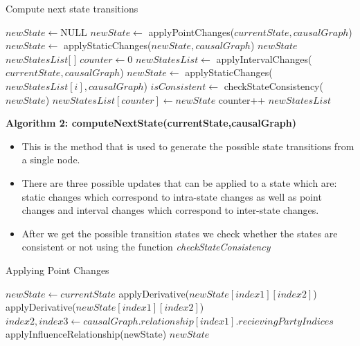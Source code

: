 \documentclass{article}
\begin{document}
\begin{algorithm}[!h]
	\caption{Compute next state transitions}\label{nextstate}
	\begin{algorithmic}[1]
		\State $newState \gets \text{NULL}$ 
		\State $newState \gets$ applyPointChanges($currentState,causalGraph$)
		\State $newState \gets$ applyStaticChanges($newState,causalGraph$)
		\State \Return $newState$
		\EndIf
		\State $newStatesList$[ ]
		\State $counter \gets 0$
		\State $newStatesList \gets$ applyIntervalChanges($currentState,causalGraph$)
		\State $newState \gets$ applyStaticChanges($newStatesList[i],causalGraph$)
		\State $isConsistent \gets$ checkStateConsistency($newState$)
		\State $newStatesList[counter] \gets newState$
		\State counter++
		\EndIf
		\EndFor
		\State \Return $newStatesList$
		\EndProcedure
	\end{algorithmic}
\end{algorithm}
\textbf{Algorithm 2: computeNextState(currentState,causalGraph)}
\begin{itemize}
	\item This is the method that is used to generate the possible state transitions from a single node.
	\item There are three possible updates that can be applied to a state which are: static changes which correspond to intra-state changes as well as point changes and interval changes which correspond to inter-state changes. 
	\item After we get the possible transition states we check whether the states are consistent or not using the function \textit{checkStateConsistency}
\end{itemize}

\begin{algorithm}[!h]
	\caption{Applying Point Changes}\label{pointchanges}
	\begin{algorithmic}[1]
		\State $newState \gets currentState$
		\State applyDerivative($newState[index1][index2]$)
		\EndIf
		\State applyDerivative($newState[index1][index2]$)
		\EndIf
		\EndIf
		\EndFor
		\EndFor
		\State $index2,index3 \gets causalGraph.relationship[index1].recievingPartyIndices$
		\State applyInfluenceRelationship(newState)
		\EndIf
		\EndIf
		\EndFor
		\State \Return $newState$
		\EndProcedure
	\end{algorithmic}
\end{algorithm}
\end{document}
